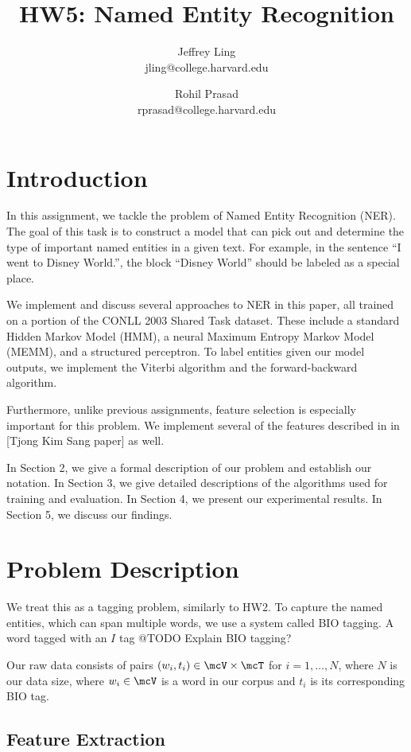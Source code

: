 \documentclass[11pt]{article}
\title{HW5: Named Entity Recognition}
\author{Jeffrey Ling \\ jling@college.harvard.edu \and Rohil Prasad \\ rprasad@college.harvard.edu}
\begin{document}
\maketitle{}
\section{Introduction}

In this assignment, we tackle the problem of Named Entity Recognition (NER). The goal of this task is to construct a model that can pick out and determine the type of important named entities in a given text. For example, in the sentence ``I went to Disney World.'', the block ``Disney World'' should be labeled as a special place. 

We implement and discuss several approaches to NER in this paper, all trained on a portion of the CONLL 2003 Shared Task dataset. These include a standard Hidden Markov Model (HMM), a neural Maximum Entropy Markov Model (MEMM), and a structured perceptron. To label entities given our model outputs, we implement the Viterbi algorithm and the forward-backward algorithm. 

Furthermore, unlike previous assignments, feature selection is especially important for this problem. We implement several of the features described in in [Tjong Kim Sang paper] as well. 

In Section 2, we give a formal description of our problem and establish our notation. In Section 3, we give detailed descriptions of the algorithms used for training and evaluation. In Section 4, we present our experimental results. In Section 5, we discuss our findings. 

\section{Problem Description}

We treat this as a tagging problem, similarly to HW2. To capture the named entities, which can span multiple words, we use a system called BIO tagging. A word tagged with an $I$ tag @TODO Explain BIO tagging? 

Our raw data consists of pairs $(w_i, t_i) \in \mcV \times \mcT$ for $i = 1, \dots, N$, where $N$ is our data size, where $w_i \in \mcV$ is a word in our corpus and $t_i$ is its corresponding BIO tag.

\subsection{Feature Extraction}
\end{document}
